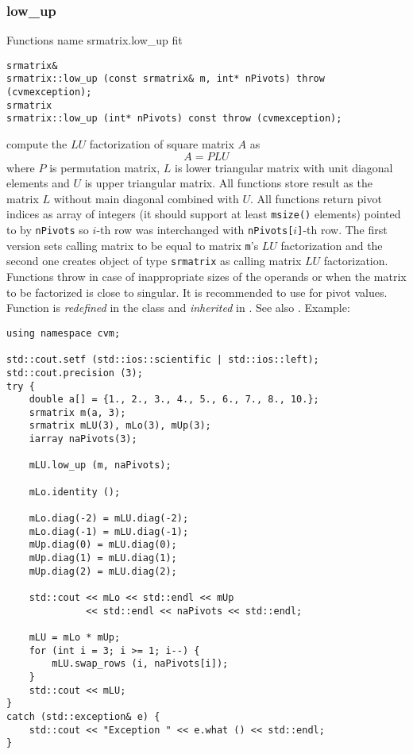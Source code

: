 \subsubsection{low\_up}
Functions%
\pdfdest name {srmatrix.low_up} fit
\begin{verbatim}
srmatrix& 
srmatrix::low_up (const srmatrix& m, int* nPivots) throw (cvmexception);
srmatrix
srmatrix::low_up (int* nPivots) const throw (cvmexception);
\end{verbatim}
compute the $LU$ factorization of square matrix $A$ as
\begin{equation*}
A=PLU
\end{equation*}
where $P$ is  permutation matrix, $L$ is  lower
triangular matrix with unit diagonal
elements and $U$ is  upper triangular matrix.
All  functions store  result as the matrix $L$ without
main diagonal combined with $U$. All  functions
return pivot indices as  array of integers
(it should support at least \verb"msize()" elements)
pointed to by \verb"nPivots" so \hbox{$i$-th} row
was interchanged with \hbox{\verb"nPivots["$i$\verb"]"-th} row.
The first version sets  calling matrix to be equal to matrix
\verb"m"'s $LU$ factorization and the second one
creates  object of type \verb"srmatrix" as  calling matrix
$LU$ factorization.
Functions throw 
in case of inappropriate
sizes of the operands or when the matrix to be factorized is close to
singular. It is recommended to use 
for pivot values.
Function is \emph{redefined} in the class
and \emph{inherited} in .
See also
.
Example:
\begin{Verbatim}
using namespace cvm;

std::cout.setf (std::ios::scientific | std::ios::left); 
std::cout.precision (3);
try {
    double a[] = {1., 2., 3., 4., 5., 6., 7., 8., 10.};
    srmatrix m(a, 3);
    srmatrix mLU(3), mLo(3), mUp(3);
    iarray naPivots(3);

    mLU.low_up (m, naPivots);

    mLo.identity ();

    mLo.diag(-2) = mLU.diag(-2);
    mLo.diag(-1) = mLU.diag(-1);
    mUp.diag(0) = mLU.diag(0);
    mUp.diag(1) = mLU.diag(1);
    mUp.diag(2) = mLU.diag(2);

    std::cout << mLo << std::endl << mUp 
              << std::endl << naPivots << std::endl;

    mLU = mLo * mUp;
    for (int i = 3; i >= 1; i--) {
        mLU.swap_rows (i, naPivots[i]);
    }
    std::cout << mLU;
}
catch (std::exception& e) {
    std::cout << "Exception " << e.what () << std::endl;
}
\end{Verbatim}
